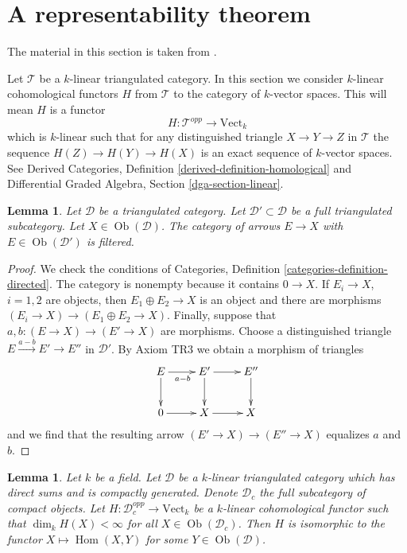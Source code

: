 \documentclass{stacks-project}
\newenvironment{reference}{\comment}{\endcomment}
\theoremstyle{plain}
\newtheorem{lemma}[subsection]{Lemma}
\theoremstyle{definition}
\theoremstyle{remark}
\numberwithin{equation}{subsection}
\def\Hom{\mathop{\mathrm{Hom}}\nolimits}
\def\Ob{\mathop{\mathrm{Ob}}\nolimits}
\begin{document}
\section{A representability theorem}
\label{section-bondal-van-den-bergh}

\noindent
The material in this section is taken from \cite{BvdB}.

\medskip\noindent
Let $\mathcal{T}$ be a $k$-linear triangulated category.
In this section we consider $k$-linear cohomological functors
$H$ from $\mathcal{T}$ to the category of $k$-vector spaces.
This will mean $H$ is a functor
$$
H : \mathcal{T}^{opp} \longrightarrow \text{Vect}_k
$$
which is $k$-linear such that for any distinguished triangle
$X \to Y \to Z$ in $\mathcal{T}$ the sequence $H(Z) \to H(Y) \to H(X)$
is an exact sequence of $k$-vector spaces. See
Derived Categories, Definition \ref{derived-definition-homological}
and Differential Graded Algebra, Section \ref{dga-section-linear}.

\begin{lemma}
\label{lemma-maps-from-compact-filtered}
Let $\mathcal{D}$ be a triangulated category. Let
$\mathcal{D}' \subset \mathcal{D}$ be a full triangulated subcategory. Let
$X \in \Ob(\mathcal{D})$. The category of arrows $E \to X$ with
$E \in \Ob(\mathcal{D}')$ is filtered.
\end{lemma}

\begin{proof}
We check the conditions of
Categories, Definition \ref{categories-definition-directed}.
The category is nonempty because it contains $0 \to X$.
If $E_i \to X$, $i = 1, 2$ are objects, then $E_1 \oplus E_2 \to X$
is an object and there are morphisms $(E_i \to X) \to (E_1 \oplus E_2 \to X)$.
Finally, suppose that $a, b : (E \to X) \to (E' \to X)$ are morphisms.
Choose a distinguished triangle $E \xrightarrow{a - b} E' \to E''$
in $\mathcal{D}'$. By Axiom TR3 we obtain a morphism of triangles
$$
\xymatrix{
E \ar[r]_{a - b} \ar[d] &
E' \ar[d] \ar[r] & E'' \ar[d] \\
0 \ar[r] &
X \ar[r] &
X
}
$$
and we find that the resulting arrow $(E' \to X) \to (E'' \to X)$
equalizes $a$ and $b$.
\end{proof}

\begin{lemma}
\label{lemma-van-den-bergh}
\begin{reference}
\cite[Lemma 2.14]{CKN}
\end{reference}
Let $k$ be a field. Let $\mathcal{D}$ be a $k$-linear triangulated category
which has direct sums and is compactly generated.
Denote $\mathcal{D}_c$ the full
subcategory of compact objects. Let $H : \mathcal{D}_c^{opp} \to \text{Vect}_k$
be a $k$-linear cohomological functor such that
$\dim_k H(X) < \infty$ for all $X \in \Ob(\mathcal{D}_c)$.
Then $H$ is isomorphic to the functor $X \mapsto \Hom(X, Y)$
for some $Y \in \Ob(\mathcal{D})$.
\end{lemma}
\end{document}
